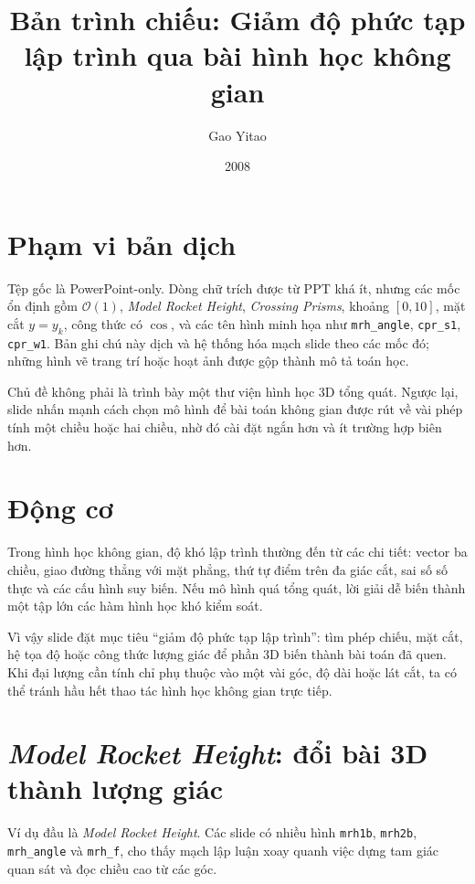 \documentclass[11pt]{article}
\title{Bản trình chiếu: Giảm độ phức tạp lập trình qua bài hình học không gian}
\author{Gao Yitao}
\date{2008}
\newcommand{\Oh}{\mathcal{O}}
\begin{document}
\maketitle


\section{Phạm vi bản dịch}

Tệp gốc là PowerPoint-only. Dòng chữ trích được từ PPT khá ít, nhưng các mốc
ổn định gồm \(\Oh(1)\), \textit{Model Rocket Height}, \textit{Crossing Prisms},
khoảng \([0,10]\), mặt cắt \(y=y_k\), công thức có \(\cos\), và các tên hình
minh họa như \texttt{mrh\_angle}, \texttt{cpr\_s1}, \texttt{cpr\_w1}. Bản ghi
chú này dịch và hệ thống hóa mạch slide theo các mốc đó; những hình vẽ trang
trí hoặc hoạt ảnh được gộp thành mô tả toán học.

Chủ đề không phải là trình bày một thư viện hình học 3D tổng quát. Ngược lại,
slide nhấn mạnh cách chọn mô hình để bài toán không gian được rút về vài phép
tính một chiều hoặc hai chiều, nhờ đó cài đặt ngắn hơn và ít trường hợp biên
hơn.

\section{Động cơ}

Trong hình học không gian, độ khó lập trình thường đến từ các chi tiết:
vector ba chiều, giao đường thẳng với mặt phẳng, thứ tự điểm trên đa giác cắt,
sai số số thực và các cấu hình suy biến. Nếu mô hình quá tổng quát, lời giải
dễ biến thành một tập lớn các hàm hình học khó kiểm soát.

Vì vậy slide đặt mục tiêu ``giảm độ phức tạp lập trình'': tìm phép chiếu, mặt
cắt, hệ tọa độ hoặc công thức lượng giác để phần 3D biến thành bài toán đã
quen. Khi đại lượng cần tính chỉ phụ thuộc vào một vài góc, độ dài hoặc lát
cắt, ta có thể tránh hầu hết thao tác hình học không gian trực tiếp.

\section{\textit{Model Rocket Height}: đổi bài 3D thành lượng giác}

Ví dụ đầu là \textit{Model Rocket Height}. Các slide có nhiều hình
\texttt{mrh1b}, \texttt{mrh2b}, \texttt{mrh\_angle} và \texttt{mrh\_f}, cho
thấy mạch lập luận xoay quanh việc dựng tam giác quan sát và đọc chiều cao
từ các góc.
\end{document}
